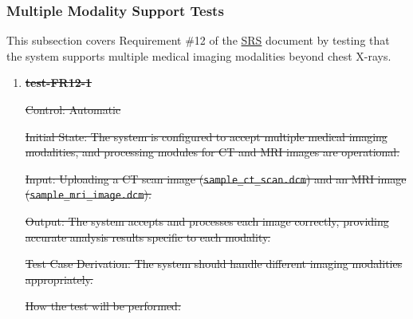 \documentclass[12pt, titlepage]{article}
\begin{document}
\subsubsection{Multiple Modality Support Tests}

This subsection covers Requirement \#12 of the \href{https://github.com/RezaJodeiri/CXR-Capstone/blob/main/docs/SRS/SRS.pdf}{SRS} \citep{SRS}
document by testing that the system supports multiple medical imaging modalities beyond chest X-rays.

\begin{enumerate}

\item \textbf{\sout{test-FR12-1}} \label{test-FR12-1}

\sout{Control: Automatic}

\sout{Initial State: The system is configured to accept multiple medical imaging modalities, and processing modules for CT and MRI images are operational.}

\sout{Input: Uploading a CT scan image (\texttt{sample\_ct\_scan.dcm}) and an MRI image (\texttt{sample\_mri\_image.dcm}).}

\sout{Output: The system accepts and processes each image correctly, providing accurate analysis results specific to each modality.}

\sout{Test Case Derivation: The system should handle different imaging modalities appropriately.}

\sout{How the test will be performed:}


\end{enumerate}
\end{document}
